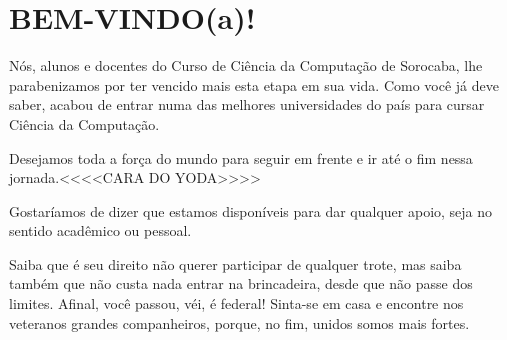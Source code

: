 \section{BEM-VINDO(a)!}

Nós, alunos e docentes do Curso de Ciência da Computação de Sorocaba, lhe parabenizamos por ter vencido mais esta etapa em sua vida. Como você já deve saber, acabou de entrar numa das melhores universidades do país para cursar Ciência da Computação. 

Desejamos toda a força do mundo para seguir em frente e ir até o fim nessa jornada.<<<<CARA DO YODA>>>>

Gostaríamos de dizer que estamos disponíveis para dar qualquer apoio, seja no sentido acadêmico ou pessoal.

Saiba que é seu direito não querer participar de qualquer trote, mas saiba também que não custa nada entrar na brincadeira, desde que não passe dos limites. Afinal, você passou, véi, é federal! Sinta-se em casa e encontre nos veteranos grandes companheiros, porque, no fim, unidos somos mais fortes.
